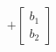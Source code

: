 \documentclass[preview]{standalone}
\begin{document}
\begin{align*}
+ \begin{bmatrix} b_1 \\ b_2 \end{bmatrix}
\end{align*}
\end{document}
